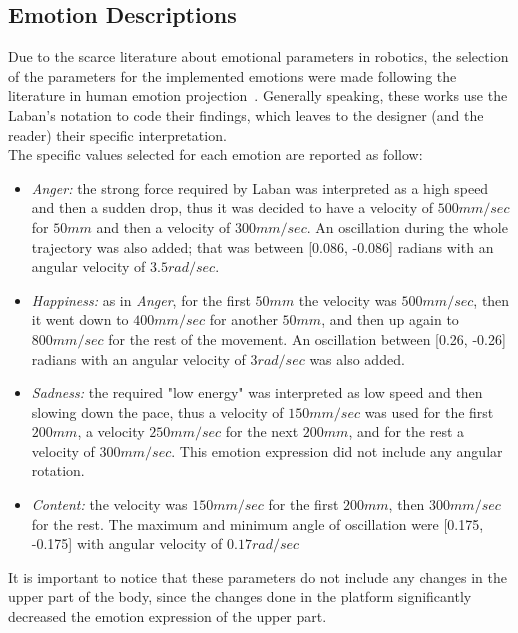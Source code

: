 \subsection{Emotion Descriptions} 
Due to the scarce literature about emotional parameters in robotics, the selection of the parameters for the implemented emotions were made following the literature in human emotion projection~\cite{Nadia2013, Crane2013}.
Generally speaking, these works use the Laban's notation to code their findings, which leaves to the designer (and the reader) their specific interpretation.\\
The specific values selected for each emotion are reported as follow:
\begin{itemize}
	\item \textit{\textit{Anger}:} the strong force required by Laban was interpreted as a high speed and then a sudden drop, thus it was decided to have a velocity of $500mm/sec$ for $50mm$ and then a velocity of $300mm/sec$. An oscillation during the whole trajectory was also added; that was between [0.086, -0.086] radians with an angular velocity of $3.5 rad/sec$.
	\item \textit{\textit{Happiness}:} as in \textit{Anger}, for the first $50mm$ the velocity was $500mm/sec$, then it went down to $400mm/sec$ for another $50mm$, and then up again to $800mm/sec$ for the rest of the movement. 
	An oscillation between [0.26, -0.26] radians with an angular velocity of $3rad/sec$ was also added.
	\item \textit{Sadness:} the required "low energy" was interpreted as low speed and then slowing down the pace, thus a velocity of $150mm/sec$ was used for the first $200mm$, a velocity $250mm/sec$ for the next $200mm$, and for the rest a velocity of $300mm/sec$. This emotion expression did not include any angular rotation.
	\item \textit{Content:} the velocity was $150mm/sec$ for the first $200mm$, then $300mm/sec$ for the rest. The maximum and minimum angle of oscillation were [0.175, -0.175] with angular velocity of $0.17rad/sec$
\end{itemize}
It is important to notice that these parameters do not include any changes in the upper part of the body, since the changes done in the platform significantly decreased the emotion expression of the upper part.
